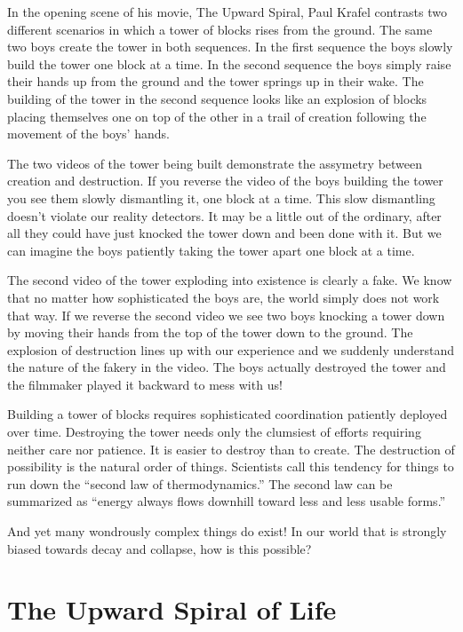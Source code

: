 \documentclass[ebook,11pt,openany,twoside]{memoir}
\newcommand{\imagefacingchapter}[1]{
  \cleartoverso
  \clearpage \null
  \thispagestyle{cleared}
  \AddToShipoutPictureBG*{%
    \AtStockLowerLeft{%
      \texttt{[image: \#1]}
    }
  }
  \clearpage
}
\begin{document}
In the opening scene of his movie, The Upward Spiral, Paul Krafel contrasts two
different scenarios in which a tower of blocks rises from the ground. The same
two boys create the tower in both sequences. In the first sequence the boys
slowly build the tower one block at a time. In the second sequence the boys
simply raise their hands up from the ground and the tower springs up in their
wake. The building of the tower in the second sequence looks like an explosion
of blocks placing themselves one on top of the other in a trail of creation
following the movement of the boys' hands.

The two videos of the tower being built demonstrate the assymetry between
creation and destruction. If you reverse the video of the boys building the
tower you see them slowly dismantling it, one block at a time. This slow
dismantling doesn't violate our reality detectors. It may be a little out of
the ordinary, after all they could have just knocked the tower down and been
done with it. But we can imagine the boys patiently taking the tower apart one
block at a time.

The second video of the tower exploding into existence is clearly a fake. We
know that no matter how sophisticated the boys are, the world simply does not
work that way. If we reverse the second video we see two boys knocking a tower
down by moving their hands from the top of the tower down to the ground. The
explosion of destruction lines up with our experience and we suddenly
understand the nature of the fakery in the video. The boys actually destroyed
the tower and the filmmaker played it backward to mess with us!

Building a tower of blocks requires sophisticated coordination patiently
deployed over time. Destroying the tower needs only the clumsiest of efforts
requiring neither care nor patience. It is easier to destroy than to create.
The destruction of possibility is the natural order of things. Scientists call
this tendency for things to run down the ``second law of thermodynamics.'' The
second law can be summarized as ``energy always flows downhill toward less and
less usable forms.''

And yet many wondrously complex things do exist! In our world that is strongly
biased towards decay and collapse, how is this possible?

\imagefacingchapter{images/UpwardSpiral}
\chapter{The Upward Spiral of Life}
\end{document}
